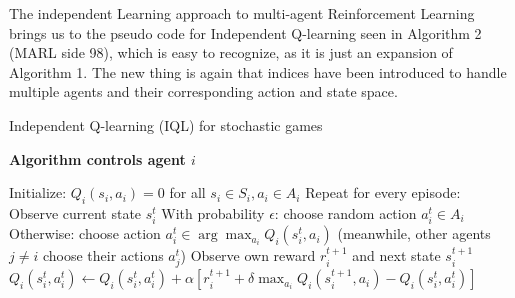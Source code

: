 \documentclass{article}
\begin{document}
\newline
\newline
The independent Learning approach to multi-agent Reinforcement Learning brings us to the pseudo code for Independent Q-learning seen in Algorithm 2 (MARL side 98), which is easy to recognize, as it is just an expansion of Algorithm 1. The new thing is again that indices have been introduced to handle multiple agents and their corresponding action and state space.
\begin{algorithm}[H]
\caption{Independent Q-learning (IQL) for stochastic games}
\textbf{Algorithm controls agent \(i\)}
\begin{algorithmic}[1]
\State Initialize: \( Q_i(s_i, a_i) = 0 \) for all \( s_i \in S_i, a_i \in A_i \)
\State Repeat for every episode:
    \State Observe current state \( s_i^t \)
    \State With probability \( \epsilon \): choose random action \( a_i^t \in A_i \)
    \State Otherwise: choose action \( a_i^t \in \arg \max_{a_i} Q_i(s_i^t, a_i) \)
    \State (meanwhile, other agents \( j \neq i \) choose their actions \( a_j^t \))
    \State Observe own reward \( r_i^{t+1} \) and next state \( s_i^{t+1} \)
    \State \( Q_i(s_i^t, a_i^t) \gets Q_i(s_i^t, a_i^t) + \alpha [r_i^{t+1} + \delta \max_{a_i} Q_i(s_i^{t+1}, a_i) - Q_i(s_i^t, a_i^t)] \)
\EndFor
\end{algorithmic}
\end{algorithm}
\end{document}
